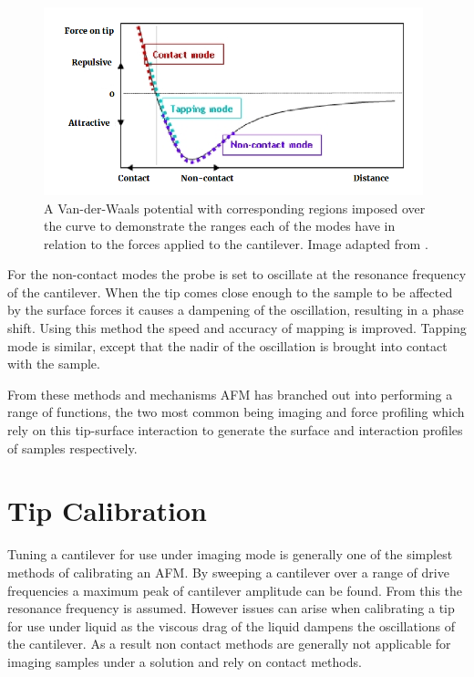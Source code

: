 \begin{figure}[h!!!]     %
        \begin{center}
          \includegraphics[width=110mm]{chapter2/Regions.png}
\end{center}
\caption{A Van-der-Waals potential with corresponding regions imposed over the curve to demonstrate the ranges each of the modes have in relation to the forces applied to the cantilever. Image adapted from \cite{GoodAFM}.}
\label{fig:Regions}                 %
\end{figure}

For the non-contact modes the probe is set to oscillate at the resonance frequency of the cantilever. When the tip comes close enough to the sample to be affected by the surface forces it causes a dampening of the oscillation, resulting in a phase shift. Using this method the speed and accuracy of mapping is improved. Tapping mode is similar, except that the nadir of the oscillation is brought into contact with the sample.

From these methods and mechanisms AFM has branched out into performing a range of functions, the two most common being imaging and force profiling which rely on this tip-surface interaction to generate the surface and interaction profiles of samples respectively.

\section{Tip Calibration}
\label{chap:cali}

Tuning a cantilever for use under imaging mode is generally one of the simplest methods of calibrating an AFM. By sweeping a cantilever over a range of drive frequencies a maximum peak of cantilever amplitude can be found. From this the resonance frequency is assumed. However issues can arise when calibrating a tip for use under liquid as the viscous drag of the liquid dampens the oscillations of the cantilever. As a result non contact methods are generally not applicable for imaging samples under a solution and rely on contact methods.

